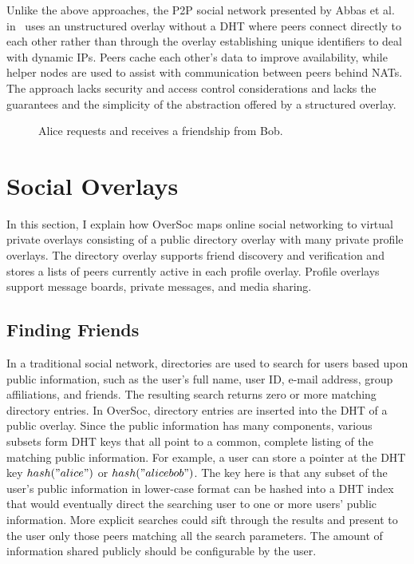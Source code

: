 Unlike the above approaches, the P2P social network presented by Abbas et al.
in~\cite{tribler-osn} uses an unstructured overlay without a DHT where peers
connect directly to each other rather than through the overlay establishing
unique identifiers to deal with dynamic IPs.  Peers cache each other's data to
improve availability, while helper nodes are used to assist with communication
between peers behind NATs.  The approach lacks security and access control
considerations and lacks the guarantees and the simplicity of the abstraction
offered by a structured overlay.

\begin{figure}
\centering
{}
\caption{Alice requests and receives a friendship from Bob.}
\label{fig:friend_request}
\end{figure}

\section{Social Overlays}
\label{vpo:social_overlays}

In this section, I explain how OverSoc maps online social networking to virtual
private overlays consisting of a public directory overlay with many private
profile overlays.  The directory overlay supports friend discovery and
verification and stores a lists of peers currently active in each profile
overlay.  Profile overlays support message boards, private messages, and media
sharing.

\subsection{Finding Friends}

In a traditional social network, directories are used to search for users based
upon public information, such as the user's full name, user ID, e-mail address,
group affiliations, and friends.  The resulting search returns zero or more
matching directory entries.  In OverSoc, directory entries are inserted into
the DHT of a public overlay.  Since the public information has many components,
various subsets form DHT keys that all point to a common, complete listing of
the matching public information.  For example, a user can store a pointer at
the DHT key $hash("alice")$ or $hash("alice bob")$.  The key here is that any
subset of the user's public information in lower-case format can be hashed into
a DHT index that would eventually direct the searching user to one or more
users' public information.  More explicit searches could sift through the
results and present to the user only those peers matching all the search
parameters.  The amount of information shared publicly should be configurable
by the user.

